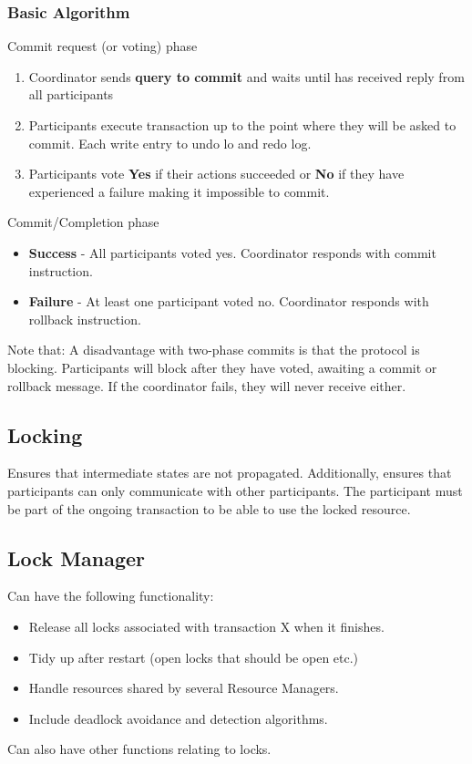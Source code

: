 \subsubsection{Basic Algorithm}
Commit request (or voting) phase 
\begin{enumerate}
\item Coordinator sends \textbf{query to commit} and waits until has received reply from all participants
\item Participants execute transaction up to the point where they will be asked to commit. Each write entry to undo lo and redo log.
\item Participants vote \textbf{Yes} if their actions succeeded or \textbf{No} if they have experienced a failure making it impossible to commit.
\end{enumerate}
Commit/Completion phase
\begin{itemize}
\item \textbf{Success} - All participants voted yes. Coordinator responds with commit instruction.
\item \textbf{Failure} - At least one participant voted no. Coordinator responds with rollback instruction.
\end{itemize}

Note that: A disadvantage with two-phase commits is that the protocol is blocking. Participants will block after they have voted, awaiting a commit or rollback
message. If the coordinator fails, they will never receive either.

\subsection{Locking}
Ensures that intermediate states are not propagated. Additionally, ensures that participants can only communicate with other participants. The participant must be part of the ongoing transaction to be able to use the locked resource. 

\subsection{Lock Manager}
Can have the following functionality:
\begin{itemize}
\item Release all locks associated with transaction X when it finishes.
\item Tidy up after restart (open locks that should be open etc.)
\item Handle resources shared by several Resource Managers.
\item Include deadlock avoidance and detection algorithms.
\end{itemize}
Can also have other functions relating to locks.

